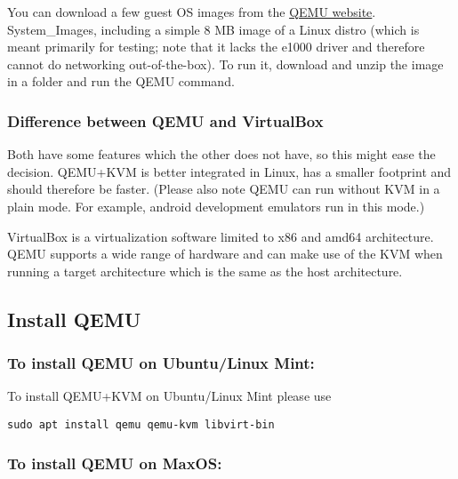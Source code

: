 You can download a few guest OS images from the
\href{https://wiki.qemu.org/Testing/System_Images}{QEMU website}.
System\_Images, including a simple 8 MB image of a Linux distro (which
is meant primarily for testing; note that it lacks the e1000 driver and
therefore cannot do networking out-of-the-box). To run it, download and
unzip the image in a folder and run the QEMU command.

\hypertarget{difference-between-qemu-and-virtualbox}{%
\subsubsection{Difference between QEMU and
VirtualBox}\label{difference-between-qemu-and-virtualbox}}

Both have some features which the other does not have, so this might
ease the decision. QEMU+KVM is better integrated in Linux, has a smaller
footprint and should therefore be faster. (Please also note QEMU can run
without KVM in a plain mode. For example, android development emulators
run in this mode.)

VirtualBox is a virtualization software limited to x86 and amd64
architecture. QEMU supports a wide range of hardware and can make use of
the KVM when running a target architecture which is the same as the host
architecture.

\hypertarget{install-qemu}{%
\subsection{Install QEMU}\label{install-qemu}}

\hypertarget{to-install-qemu-on-ubuntulinux-mint}{%
\subsubsection{To install QEMU on Ubuntu/Linux
Mint:}\label{to-install-qemu-on-ubuntulinux-mint}}

To install QEMU+KVM on Ubuntu/Linux Mint please use

\begin{verbatim}
sudo apt install qemu qemu-kvm libvirt-bin
\end{verbatim}

\hypertarget{to-install-qemu-on-maxos}{%
\subsubsection{To install QEMU on
MaxOS:}\label{to-install-qemu-on-maxos}}

